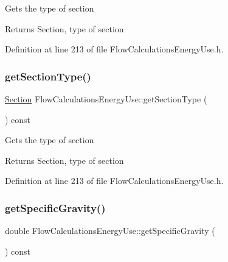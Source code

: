 Gets the type of section

\begin{DoxyReturn}{Returns}
Section, type of section 
\end{DoxyReturn}


Definition at line 213 of file Flow\+Calculations\+Energy\+Use.\+h.

\mbox{\label{class_flow_calculations_energy_use_ae88cc4f93028907c4c12e8925f63266b}} 
\subsubsection{\texorpdfstring{get\+Section\+Type()}{getSectionType()}\hspace{0.1cm}{\footnotesize\ttfamily [3/3]}}
{\footnotesize\ttfamily \hyperlink{class_flow_calculations_energy_use_afbabab0da698748de91369a5dfc7662a}{Section} Flow\+Calculations\+Energy\+Use\+::get\+Section\+Type (\begin{DoxyParamCaption}{ }\end{DoxyParamCaption}) const\hspace{0.3cm}{\ttfamily [inline]}}

Gets the type of section

\begin{DoxyReturn}{Returns}
Section, type of section 
\end{DoxyReturn}


Definition at line 213 of file Flow\+Calculations\+Energy\+Use.\+h.

\mbox{\label{class_flow_calculations_energy_use_adc3ac2406e00a75c33be0a6a66153da3}} 
\subsubsection{\texorpdfstring{get\+Specific\+Gravity()}{getSpecificGravity()}\hspace{0.1cm}{\footnotesize\ttfamily [1/3]}}
{\footnotesize\ttfamily double Flow\+Calculations\+Energy\+Use\+::get\+Specific\+Gravity (\begin{DoxyParamCaption}{ }\end{DoxyParamCaption}) const\hspace{0.3cm}{\ttfamily [inline]}}

